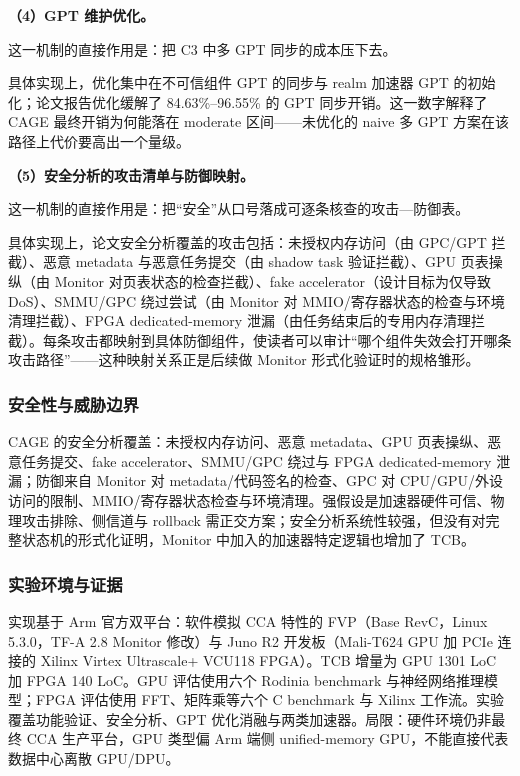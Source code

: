 \documentclass[11pt]{ctexart}
\begin{document}
\noindent\textbf{（4）GPT 维护优化。}\par
这一机制的直接作用是：把 C3 中多 GPT 同步的成本压下去。\par
具体实现上，优化集中在不可信组件 GPT 的同步与 realm 加速器 GPT 的初始化；论文报告优化缓解了 84.63\%--96.55\% 的 GPT 同步开销。这一数字解释了 CAGE 最终开销为何能落在 moderate 区间——未优化的 naive 多 GPT 方案在该路径上代价要高出一个量级。\par
\noindent\textbf{（5）安全分析的攻击清单与防御映射。}\par
这一机制的直接作用是：把“安全”从口号落成可逐条核查的攻击—防御表。\par
具体实现上，论文安全分析覆盖的攻击包括：未授权内存访问（由 GPC/GPT 拦截）、恶意 metadata 与恶意任务提交（由 shadow task 验证拦截）、GPU 页表操纵（由 Monitor 对页表状态的检查拦截）、fake accelerator（设计目标为仅导致 DoS）、SMMU/GPC 绕过尝试（由 Monitor 对 MMIO/寄存器状态的检查与环境清理拦截）、FPGA dedicated-memory 泄漏（由任务结束后的专用内存清理拦截）。每条攻击都映射到具体防御组件，使读者可以审计“哪个组件失效会打开哪条攻击路径”——这种映射关系正是后续做 Monitor 形式化验证时的规格雏形。\par
\subsubsection{安全性与威胁边界}
CAGE 的安全分析覆盖：未授权内存访问、恶意 metadata、GPU 页表操纵、恶意任务提交、fake accelerator、SMMU/GPC 绕过与 FPGA dedicated-memory 泄漏；防御来自 Monitor 对 metadata/代码签名的检查、GPC 对 CPU/GPU/外设访问的限制、MMIO/寄存器状态检查与环境清理。强假设是加速器硬件可信、物理攻击排除、侧信道与 rollback 需正交方案；安全分析系统性较强，但没有对完整状态机的形式化证明，Monitor 中加入的加速器特定逻辑也增加了 TCB。\par
\subsubsection{实验环境与证据}
实现基于 Arm 官方双平台：软件模拟 CCA 特性的 FVP（Base RevC，Linux 5.3.0，TF-A 2.8 Monitor 修改）与 Juno R2 开发板（Mali-T624 GPU 加 PCIe 连接的 Xilinx Virtex Ultrascale+ VCU118 FPGA）。TCB 增量为 GPU 1301 LoC 加 FPGA 140 LoC。GPU 评估使用六个 Rodinia benchmark 与神经网络推理模型；FPGA 评估使用 FFT、矩阵乘等六个 C benchmark 与 Xilinx 工作流。实验覆盖功能验证、安全分析、GPT 优化消融与两类加速器。局限：硬件环境仍非最终 CCA 生产平台，GPU 类型偏 Arm 端侧 unified-memory GPU，不能直接代表数据中心离散 GPU/DPU。\par
\end{document}
